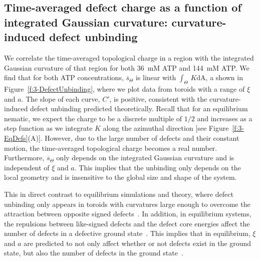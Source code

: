 \subsection{Time-averaged defect charge as a function of integrated Gaussian curvature: curvature-induced defect unbinding}
We correlate the time-averaged topological charge in a region with the integrated Gaussian curvature of that region for both 36~mM ATP and 144~mM ATP.
We find that for both ATP concentrations, $\overbar{s}_{\Theta}$ is linear with $\int_{\Theta}\,K\textrm{dA}$, a shown in Figure~\ref{f:3-DefectUnbinding}, where we plot data from toroids with a range of $\xi$ and $a$.
The slope of each curve, $C'$, is positive, consistent with the curvature-induced defect unbinding predicted theoretically.
Recall that for an equilibrium nematic, we expect the charge to be a discrete multiple of $1/2$ and increases as a step function as we integrate $K$ along the azimuthal direction [see Figure~\ref{f:3-EqDefs}(A)].
However, due to the large number of defects and their constant motion, the time-averaged topological charge becomes a real number.
Furthermore, $\overbar{s}_{\Theta}$ only depends on the integrated Gaussian curvature and is independent of $\xi$ and $a$.
This implies that the unbinding only depends on the local geometry and is insensitive to the  global size and shape of the system.

This in direct contrast to equilibrium simulations and theory, where defect unbinding only appears in toroids with curvatures large enough to overcome the attraction between opposite signed defects~\cite{RN36,RN22}.
In addition, in equilibrium systems, the repulsions between like-signed defects and the defect core energies affect the number of defects in a defective ground state~\cite{RN36}.
This implies that in equilibrium, $\xi$ and $a$ are predicted to not only affect whether or not defects exist in the ground state, but also the number of defects in the ground state~\cite{RN36,RN19,RN22,RN20,RN78}.

